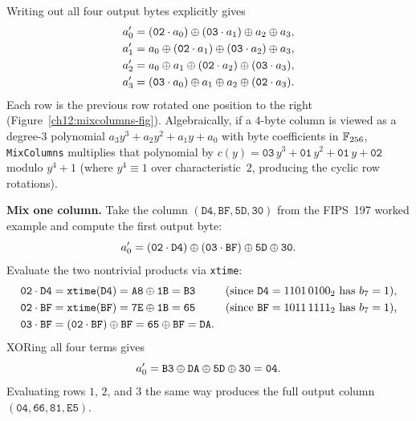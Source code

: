 Writing out all four output bytes explicitly gives
\begin{align*}
a_0' &= (\mathtt{02}\cdot a_0) \oplus (\mathtt{03}\cdot a_1) \oplus a_2 \oplus a_3, \\
a_1' &= a_0 \oplus (\mathtt{02}\cdot a_1) \oplus (\mathtt{03}\cdot a_2) \oplus a_3, \\
a_2' &= a_0 \oplus a_1 \oplus (\mathtt{02}\cdot a_2) \oplus (\mathtt{03}\cdot a_3), \\
a_3' &= (\mathtt{03}\cdot a_0) \oplus a_1 \oplus a_2 \oplus (\mathtt{02}\cdot a_3).
\end{align*}
Each row is the previous row rotated one position to the right
(Figure~\ref{ch12:mixcolumns-fig}). Algebraically, if a $4$-byte column is viewed
as a degree-$3$ polynomial $a_3 y^3 + a_2 y^2 + a_1 y + a_0$ with byte
coefficients in $\mathbb{F}_{256}$, \texttt{MixColumns} multiplies that polynomial by
$c(y) = \mathtt{03}\,y^3 + \mathtt{01}\,y^2 + \mathtt{01}\,y + \mathtt{02}$ modulo
$y^4 + 1$ (where $y^4 \equiv 1$ over characteristic~$2$, producing the cyclic row
rotations).

\begin{walkbox}
\textbf{Mix one column.} Take the column $(\mathtt{D4}, \mathtt{BF},
\mathtt{5D}, \mathtt{30})$ from the FIPS~197 worked example and compute the first
output byte:
\[
a_0' = (\mathtt{02}\cdot \mathtt{D4}) \oplus (\mathtt{03}\cdot \mathtt{BF})
\oplus \mathtt{5D} \oplus \mathtt{30}.
\]
Evaluate the two nontrivial products via \texttt{xtime}:
\begin{align*}
\mathtt{02}\cdot\mathtt{D4} &= \texttt{xtime}(\mathtt{D4})
  = \mathtt{A8} \oplus \mathtt{1B} = \mathtt{B3}
  && \text{(since $\mathtt{D4} = 1101\,0100_2$ has $b_7 = 1$),} \\
\mathtt{02}\cdot\mathtt{BF} &= \texttt{xtime}(\mathtt{BF})
  = \mathtt{7E} \oplus \mathtt{1B} = \mathtt{65}
  && \text{(since $\mathtt{BF} = 1011\,1111_2$ has $b_7 = 1$),} \\
\mathtt{03}\cdot\mathtt{BF} &= (\mathtt{02}\cdot\mathtt{BF}) \oplus \mathtt{BF}
  = \mathtt{65} \oplus \mathtt{BF} = \mathtt{DA}.
\end{align*}
XORing all four terms gives
\[
a_0' = \mathtt{B3} \oplus \mathtt{DA} \oplus \mathtt{5D} \oplus \mathtt{30} = \mathtt{04}.
\]
Evaluating rows $1$, $2$, and $3$ the same way produces the full output column
$(\mathtt{04}, \mathtt{66}, \mathtt{81}, \mathtt{E5})$.
\end{walkbox}

